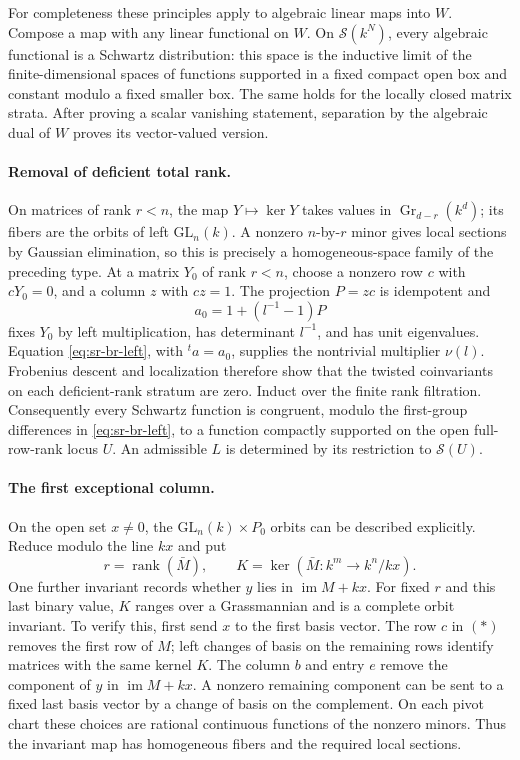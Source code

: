 For completeness these principles apply to algebraic linear
maps into \(W\).  Compose a map with any linear functional
on \(W\).  On \(\mathcal S(k^N)\), every algebraic functional
is a Schwartz distribution: this space is the inductive limit
of the finite-dimensional spaces of functions supported in a
fixed compact open box and constant modulo a fixed smaller
box.  The same holds for the locally closed matrix strata.
After proving a scalar vanishing statement, separation by the
algebraic dual of \(W\) proves its vector-valued version.

\paragraph{Removal of deficient total rank.}
On matrices of rank \(r<n\), the map \(Y\mapsto\ker Y\) takes
values in \(\operatorname{Gr}_{d-r}(k^d)\); its fibers are the
orbits of left \(\mathrm{GL}_n(k)\).  A nonzero \(n\)-by-\(r\)
minor gives local sections by Gaussian elimination, so this
is precisely a homogeneous-space family of the preceding type.
At a matrix \(Y_0\) of rank \(r<n\), choose a nonzero row
\(c\) with \(cY_0=0\), and a column \(z\) with \(cz=1\).
The projection \(P=zc\) is idempotent and
\[
                a_0=1+(l^{-1}-1)P
\]
fixes \(Y_0\) by left multiplication, has determinant \(l^{-1}\),
and has unit eigenvalues.  Equation \eqref{eq:sr-br-left}, with
\({}^ta=a_0\), supplies the nontrivial multiplier \(\nu(l)\).
Frobenius descent and localization therefore show that the
twisted coinvariants on each deficient-rank stratum are zero.
Induct over the finite rank filtration.  Consequently every
Schwartz function is congruent, modulo the first-group
differences in \eqref{eq:sr-br-left}, to a function compactly
supported on the open full-row-rank locus \(U\).
An admissible \(L\) is determined by its restriction to
\(\mathcal S(U)\).

\paragraph{The first exceptional column.}
On the open set \(x\ne0\), the \(\mathrm{GL}_n(k)\times P_0\)
orbits can be described explicitly.
Reduce modulo the line \(kx\) and put
\[
 r=\operatorname{rank}(\bar M),\qquad
 K=\ker(\bar M:k^m\to k^n/kx).
\]
One further invariant records whether \(y\) lies in
\(\operatorname{im}M+kx\).
For fixed \(r\) and this last binary value, \(K\) ranges over
a Grassmannian and is a complete orbit invariant.
To verify this, first send \(x\) to the first basis vector.
The row \(c\) in \((*)\) removes the first row of \(M\);
left changes of basis on the remaining rows identify matrices
with the same kernel \(K\).  The column \(b\) and entry \(e\)
remove the component of \(y\) in \(\operatorname{im}M+kx\).
A nonzero remaining component can be sent to a fixed last
basis vector by a change of basis on the complement.
On each pivot chart these choices are rational continuous
functions of the nonzero minors.  Thus the invariant map
has homogeneous fibers and the required local sections.


